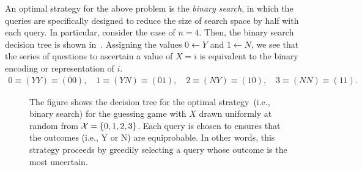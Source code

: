          An optimal strategy for the above problem is the \emph{binary search}, in which the queries are specifically designed to reduce the size of search space by half with each query.  In particular, consider the case of $n=4$. Then, the binary search decision tree is shown in~. Assigning the values $0 \leftarrow Y$ and $1\leftarrow N$, we see that the series of questions to ascertain a value of $X=i$ is equivalent to the binary encoding or representation of $i$. 
         \begin{align}
             0  \equiv (YY) \equiv (00), \quad 
             1  \equiv (YN) \equiv (01), \quad 
             2  \equiv (NY) \equiv (10), \quad
             3  \equiv (NN) \equiv (11) . 
         \end{align}
         

        \begin{figure}[hbt!]
            \centering
            \def\figwidth{0.5\columnwidth}
            \def\figheight{0.25\columnwidth} %
            
            \caption{The figure shows the decision tree for the optimal strategy~(i.e., binary search) for the guessing game with $X$ drawn uniformly at random from $\mathcal{X} = \{0, 1, 2, 3\}$. Each query is chosen to ensures that the outcomes (i.e., Y or N) are equiprobable. In other words, this strategy proceeds by greedily selecting a query whose outcome is the most uncertain.}
            \label{fig:binary-search}
        \end{figure}
  
